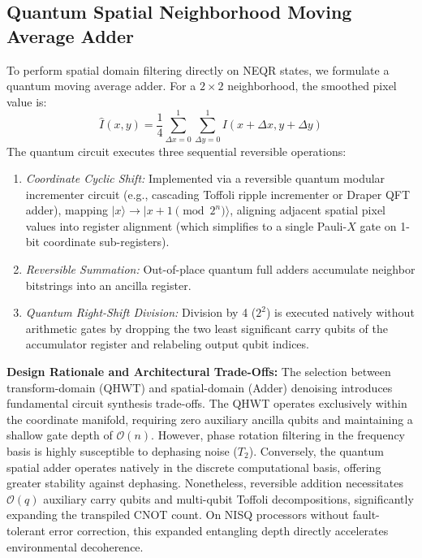 \documentclass[12pt,onecolumn,draftclsnofoot]{IEEEtran}
\begin{document}
\subsection{Quantum Spatial Neighborhood Moving Average Adder}
To perform spatial domain filtering directly on NEQR states, we formulate a quantum moving average adder. For a $2 \times 2$ neighborhood, the smoothed pixel value is:
\begin{equation}
\hat{I}(x, y) = \frac{1}{4} \sum_{\Delta x=0}^1 \sum_{\Delta y=0}^1 I(x + \Delta x, y + \Delta y)
\end{equation}
The quantum circuit executes three sequential reversible operations:
\begin{enumerate}
    \item \textit{Coordinate Cyclic Shift:} Implemented via a reversible quantum modular incrementer circuit (e.g., cascading Toffoli ripple incrementer or Draper QFT adder), mapping $|x\rangle \to |x + 1 \pmod{2^n}\rangle$, aligning adjacent spatial pixel values into register alignment (which simplifies to a single Pauli-$X$ gate on 1-bit coordinate sub-registers).
    \item \textit{Reversible Summation:} Out-of-place quantum full adders accumulate neighbor bitstrings into an ancilla register.
    \item \textit{Quantum Right-Shift Division:} Division by 4 ($2^2$) is executed natively without arithmetic gates by dropping the two least significant carry qubits of the accumulator register and relabeling output qubit indices.
\end{enumerate}

\noindent\textbf{Design Rationale and Architectural Trade-Offs:} The selection between transform-domain (QHWT) and spatial-domain (Adder) denoising introduces fundamental circuit synthesis trade-offs. The QHWT operates exclusively within the coordinate manifold, requiring zero auxiliary ancilla qubits and maintaining a shallow gate depth of $\mathcal{O}(n)$. However, phase rotation filtering in the frequency basis is highly susceptible to dephasing noise ($T_2$). Conversely, the quantum spatial adder operates natively in the discrete computational basis, offering greater stability against dephasing. Nonetheless, reversible addition necessitates $\mathcal{O}(q)$ auxiliary carry qubits and multi-qubit Toffoli decompositions, significantly expanding the transpiled CNOT count. On NISQ processors without fault-tolerant error correction, this expanded entangling depth directly accelerates environmental decoherence.
\end{document}
